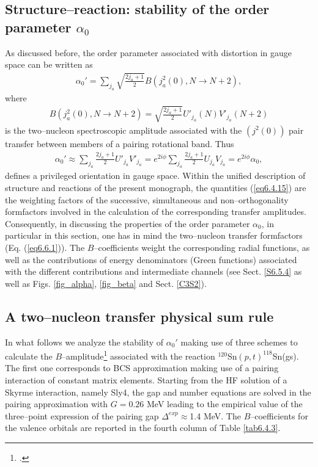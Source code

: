 \subsection{Structure--reaction: stability of the order parameter $\alpha_0$}\label{C6S2.3}
As discussed before, the order parameter associated with distortion in gauge space can be written as 
\begin{align}
\alpha_0'=\sum_{j_a}\sqrt{\frac{2j_a+1}{2}}B(j^2_a(0),N\to N+2),
\end{align}
where
\begin{align}\label{eq6.4.15x}
B(j^2_a(0),N\to N+2)=\sqrt{\frac{2j_a+1}{2}}U'_{j_a}(N)V'_{j_a}(N+2)
\end{align}
is the two--nucleon spectroscopic amplitude associated with the $(j^2(0))$ pair transfer between members of a pairing rotational band. Thus 
\begin{align}\label{eq6.4.15}
\alpha_0'\approx\sum_{j_a}\frac{2j_a+1}{2}U'_{j_a}V'_{j_a}=e^{2i\phi}\sum_{j_a}\frac{2j_a+1}{2}U_{j_a}V_{j_a}=e^{2i\phi}\alpha_0,
\end{align}
defines a privileged orientation in gauge space. Within the unified description of structure and reactions of the present monograph, the quantities (\ref{eq6.4.15}) are the weighting factors of the successive, simultaneous and non--orthogonality formfactors involved in the calculation of the corresponding transfer amplitudes. Consequently, in discussing the properties of the order parameter $\alpha_0$, in particular in this section, one has in mind the two--nucleon transfer formfactors (Eq. (\ref{eq6.6.1})).  The $B$--coefficients weight the corresponding radial functions, as well as the contributions of energy denominators (Green functions) associated with the different contributions and intermediate channels (see Sect. \ref{S6.5.4} as well as Figs. \ref{fig_alpha}, \ref{fig_beta} and Sect. \ref{C3S2}). 

\subsection{A two--nucleon transfer physical sum rule}\label{S6.4.2}
 In what follows we analyze the stability of $\alpha_0'$ making use of three schemes to calculate the $B$--amplitude\footnote{\cite{Potel:17}.} associated with the reaction $^{120}$Sn$(p,t)^{118}$Sn(gs). The first one corresponds to BCS approximation making use of a pairing interaction of constant matrix elements.  Starting from the HF solution of a Skyrme interaction, namely Sly4, the gap and number equations are solved in the pairing approximation with $G=0.26$ MeV leading to the empirical value of the three--point expression of the pairing gap $\Delta^{exp}\approx$1.4 MeV. The $B$--coefficients for the valence orbitals are reported in the fourth column of Table \ref{tab6.4.3}. 


